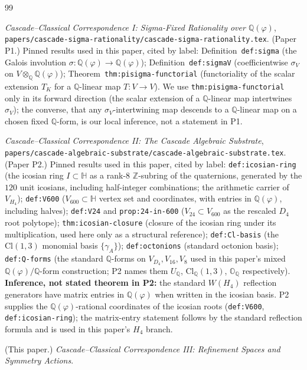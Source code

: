 \documentclass[11pt, a4paper]{amsart}
\theoremstyle{definition}
\newcommand{\Q}{\mathbb{Q}}
\newcommand{\Z}{\mathbb{Z}}
\newcommand{\HH}{\mathbb{H}}
\newcommand{\OO}{\mathbb{O}}
\newcommand{\Cl}{\mathrm{Cl}}
\begin{document}
\begin{thebibliography}{99}

\emph{Cascade--Classical Correspondence I: Sigma-Fixed Rationality
over $\Q(\varphi)$},
\texttt{papers/cascade-sigma-rationality/cascade-sigma-rationality.tex}.
(Paper P1.) Pinned results used in this paper, cited by label:
Definition~\texttt{def:sigma} (the Galois involution
$\sigma \colon \Q(\varphi) \to \Q(\varphi)$);
Definition~\texttt{def:sigmaV} (coefficientwise
$\sigma_V$ on $V \otimes_\Q \Q(\varphi)$);
Theorem~\texttt{thm:pisigma-functorial} (functoriality of the
scalar extension $T_K$ for a $\Q$-linear map $T \colon V \to V$).
We use \texttt{thm:pisigma-functorial} only in its forward direction
(the scalar extension of a $\Q$-linear map intertwines $\sigma_V$);
the converse, that any $\sigma_V$-intertwining map descends to a
$\Q$-linear map on a chosen fixed $\Q$-form, is our local
inference, not a statement in P1.

\emph{Cascade--Classical Correspondence II: The Cascade Algebraic
Substrate},
\texttt{papers/cascade-algebraic-substrate/cascade-algebraic-substrate.tex}.
(Paper P2.) Pinned results used in this paper, cited by label:
\texttt{def:icosian-ring} (the icosian ring $I \subset \HH$ as a
rank-$8$ $\Z$-subring of the quaternions, generated by the $120$
unit icosians, including half-integer combinations; the
arithmetic carrier of $V_{H_4}$);
\texttt{def:V600} ($V_{600} \subset \HH$ vertex set and
coordinates, with entries in $\Q(\varphi)$, including halves);
\texttt{def:V24} and \texttt{prop:24-in-600}
($V_{24} \subset V_{600}$ as the rescaled $D_4$ root polytope);
\texttt{thm:icosian-closure} (closure of the icosian ring under
its multiplication, used here only as a structural reference);
\texttt{def:Cl-basis} (the $\Cl(1, 3)$ monomial basis $\{\gamma_A\}$);
\texttt{def:octonions} (standard octonion basis);
\texttt{def:Q-forms} (the standard $\Q$-forms on $V_{D_4}, V_{16}, V_8$
used in this paper's mixed $\Q(\varphi)/\Q$-form construction;
P2 names them $U_\Q$, $\Cl_\Q(1,3)$, $\OO_\Q$ respectively).
\textbf{Inference, not stated theorem in P2:} the standard
$W(H_4)$ reflection generators have matrix entries in
$\Q(\varphi)$ when written in the icosian basis. P2 supplies the
$\Q(\varphi)$-rational coordinates of the icosian roots
(\texttt{def:V600}, \texttt{def:icosian-ring});
the matrix-entry statement follows by the standard reflection
formula and is used in this paper's $H_4$ branch.

(This paper.) \emph{Cascade--Classical Correspondence III:
Refinement Spaces and Symmetry Actions}.


\end{thebibliography}
\end{document}
